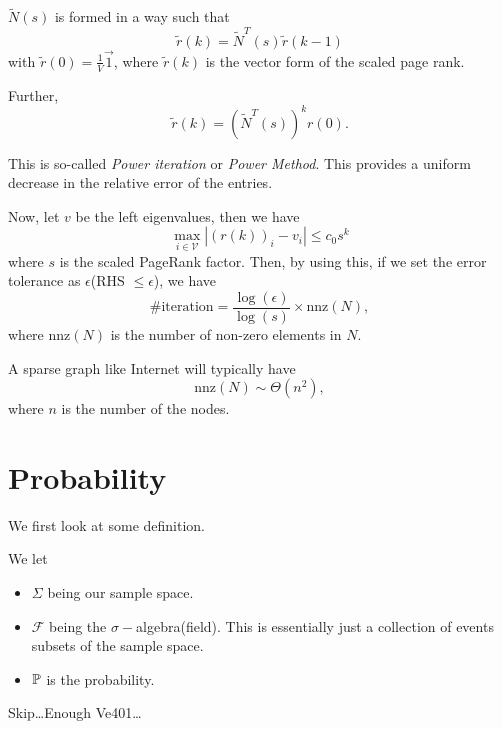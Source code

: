 \begin{answer}
	\(\widetilde{N}(s)\) is formed in a way such that
	\[
		\widetilde{r}(k) = \widetilde{N}^{T}(s)\widetilde{r}(k - 1)
	\]
	with \(\widetilde{r}(0) = \frac{1}{V}\vec{1}\), where \(\widetilde{r}(k)\) is the vector form of the scaled page rank.

	Further,
	\[
		\widetilde{r}(k) = \left(\widetilde{N}^{T}(s)\right)^k r(0).
	\]

	This is so-called \emph{Power iteration} or \emph{Power Method}. This provides a uniform decrease in the relative error of the entries.

	Now, let \(v\) be the left eigenvalues, then we have
	\[
		\max_{i\in \mathcal{V}}\left\vert (r(k))_i - v_i\right\vert \leq c_0 s^k
	\]
	where \(s\) is the scaled PageRank factor. Then, by using this, if we set the error tolerance as \(\epsilon\)(RHS \(\leq \epsilon\)), we have
	\[
		\#\text{iteration} = \frac{\log(\epsilon)}{\log(s)}\times \mathrm{nnz}(N),
	\]
	where \(\mathrm{nnz}(N)\) is the number of non-zero elements in \(N\).
	\begin{remark}
		A sparse graph like Internet will typically have
		\[
			\mathrm{nnz}(N)\sim\Theta(n^2),
		\]
		where \(n\) is the number of the nodes.
	\end{remark}
\end{answer}


\section{Probability}
We first look at some definition.
\begin{definition}
	We let
	\begin{itemize}
		\item \(\Sigma\) being our sample space.
		\item \(\mathcal{F}\) being the \(\sigma-\)algebra(field). This is essentially just a collection of events subsets of the sample space.
		\item \(\mathbb{\MakeUppercase{P}}\) is the probability.
	\end{itemize}
\end{definition}

\begin{eg}
	Skip\ldots Enough Ve401\ldots
\end{eg}

